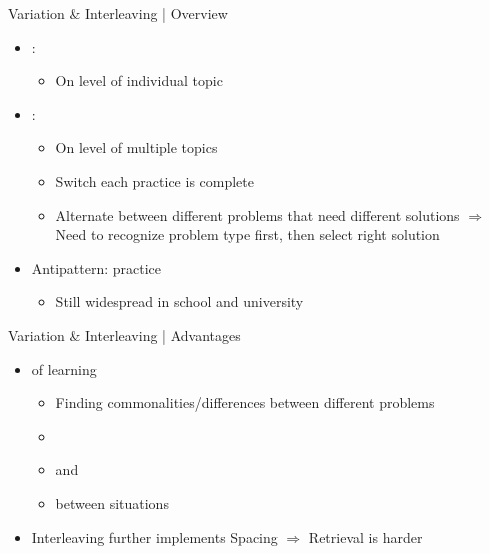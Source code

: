 \documentclass{ercisbeamer}
\begin{document}
\begin{frame}{Variation \& Interleaving | Overview}
    \begin{tbox}
        \begin{itemize}
            \item {}: 
            \begin{itemize}
                \item On level of individual topic
            \end{itemize}
            \item {}: 
            \begin{itemize}
                \item On level of multiple topics
                \item Switch  each practice is complete
                \item Alternate between different problems that need different solutions $\Rightarrow$ Need to recognize problem type first, then select right solution
            \end{itemize}
            \item Antipattern:  practice
            \begin{itemize}
                \item Still widespread in school and university
            \end{itemize}
        \end{itemize}
    \end{tbox}
\end{frame}
\setbgimage{}

\begin{frame}{Variation \& Interleaving | Advantages}
    \begin{itemize}
        \item {} of learning
        \begin{itemize}
            \item Finding commonalities/differences between different problems
            \item {}
            \item {} and 
            \item {} between situations
        \end{itemize}
        \item Interleaving further implements Spacing $\Rightarrow$ Retrieval is harder
    \end{itemize}
\end{frame}
\end{document}
